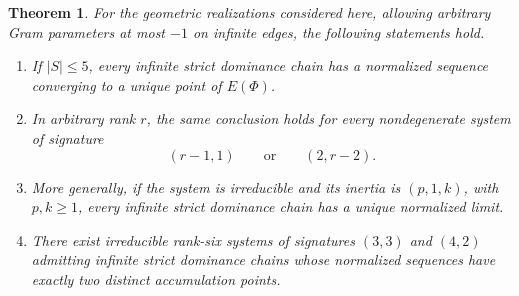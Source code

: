 \documentclass[11pt,reqno]{amsart}
\theoremstyle{plain}
\newtheorem{theorem}{Theorem}[section]
\theoremstyle{definition}
\theoremstyle{remark}
\numberwithin{equation}{section}
\begin{document}
\begin{theorem}\label{thm:main}
For the geometric realizations considered here, allowing arbitrary
Gram parameters at most $-1$ on infinite edges, the following
statements hold.
\begin{enumerate}
    \item If $|S|\le5$, every infinite strict dominance chain
    has a normalized sequence converging to a unique point
    of $E(\Phi)$.

    \item In arbitrary rank $r$, the same conclusion holds
    for every nondegenerate system of signature
    \[
    (r-1,1)
    \qquad\text{or}\qquad
    (2,r-2).
    \]

    \item More generally, if the system is irreducible and
    its inertia is $(p,1,k)$, with $p,k\ge1$, every infinite
    strict dominance chain has a unique normalized limit.

    \item There exist irreducible rank-six systems of
    signatures $(3,3)$ and $(4,2)$ admitting infinite strict
    dominance chains whose normalized sequences have exactly
    two distinct accumulation points.
\end{enumerate}
\end{theorem}
\end{document}
